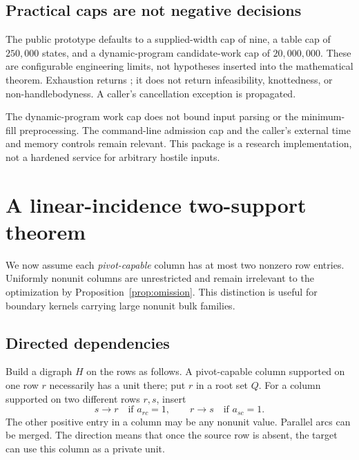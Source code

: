 \documentclass[11pt]{article}
\theoremstyle{definition}\newtheorem{definition}[theorem]{Definition}
\theoremstyle{remark}\newtheorem{remark}[theorem]{Remark}
\newcommand{\code}[1]{\texttt{\detokenize{#1}}}
\begin{document}
\subsection{Practical caps are not negative decisions}
The public prototype defaults to a supplied-width cap of nine, a table cap of $250{,}000$ states, and a dynamic-program candidate-work cap of $20{,}000{,}000$. These are configurable engineering limits, not hypotheses inserted into the mathematical theorem. Exhaustion returns \code{RESOURCE_LIMIT}; it does not return infeasibility, knottedness, or non-handlebodyness. A caller's cancellation exception is propagated.

The dynamic-program work cap does not bound input parsing or the minimum-fill preprocessing. The command-line admission cap and the caller's external time and memory controls remain relevant. This package is a research implementation, not a hardened service for arbitrary hostile inputs.

\section{A linear-incidence two-support theorem}
\label{sec:scc}

We now assume each \emph{pivot-capable} column has at most two nonzero row entries. Uniformly nonunit columns are unrestricted and remain irrelevant to the optimization by Proposition~\ref{prop:omission}. This distinction is useful for boundary kernels carrying large nonunit bulk families.

\subsection{Directed dependencies}
Build a digraph $H$ on the rows as follows. A pivot-capable column supported on one row $r$ necessarily has a unit there; put $r$ in a root set $Q$. For a column supported on two different rows $r,s$, insert
\begin{equation}
 s\longrightarrow r\quad\text{if }a_{rc}=1,
 \qquad
 r\longrightarrow s\quad\text{if }a_{sc}=1.
 \label{eq:rowarcs}
\end{equation}
The other positive entry in a column may be any nonunit value. Parallel arcs can be merged. The direction means that once the source row is absent, the target can use this column as a private unit.
\end{document}
